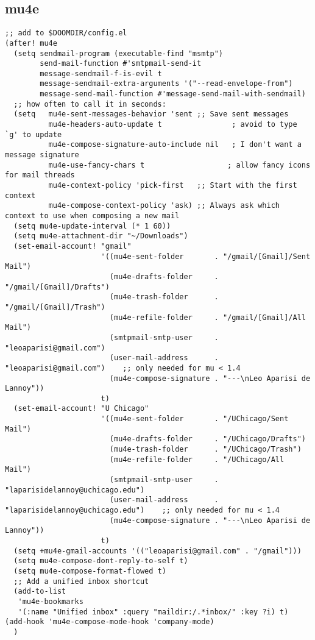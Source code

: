 \documentclass[c]{article}
\theoremstyle{plain}%
\theoremstyle{definition}
\theoremstyle{remark}
\begin{document}
\subsection{mu4e}
\label{sec:org55bb9dd}
\begin{verbatim}
;; add to $DOOMDIR/config.el
(after! mu4e
  (setq sendmail-program (executable-find "msmtp")
        send-mail-function #'smtpmail-send-it
        message-sendmail-f-is-evil t
        message-sendmail-extra-arguments '("--read-envelope-from")
        message-send-mail-function #'message-send-mail-with-sendmail)
  ;; how often to call it in seconds:
  (setq   mu4e-sent-messages-behavior 'sent ;; Save sent messages
          mu4e-headers-auto-update t                ; avoid to type `g' to update
          mu4e-compose-signature-auto-include nil   ; I don't want a message signature
          mu4e-use-fancy-chars t                   ; allow fancy icons for mail threads
          mu4e-context-policy 'pick-first   ;; Start with the first context
          mu4e-compose-context-policy 'ask) ;; Always ask which context to use when composing a new mail
  (setq mu4e-update-interval (* 1 60))
  (setq mu4e-attachment-dir "~/Downloads")
  (set-email-account! "gmail"
                      '((mu4e-sent-folder       . "/gmail/[Gmail]/Sent Mail")
                        (mu4e-drafts-folder     . "/gmail/[Gmail]/Drafts")
                        (mu4e-trash-folder      . "/gmail/[Gmail]/Trash")
                        (mu4e-refile-folder     . "/gmail/[Gmail]/All Mail")
                        (smtpmail-smtp-user     . "leoaparisi@gmail.com")
                        (user-mail-address      . "leoaparisi@gmail.com")    ;; only needed for mu < 1.4
                        (mu4e-compose-signature . "---\nLeo Aparisi de Lannoy"))
                      t)
  (set-email-account! "U Chicago"
                      '((mu4e-sent-folder       . "/UChicago/Sent Mail")
                        (mu4e-drafts-folder     . "/UChicago/Drafts")
                        (mu4e-trash-folder      . "/UChicago/Trash")
                        (mu4e-refile-folder     . "/UChicago/All Mail")
                        (smtpmail-smtp-user     . "laparisidelannoy@uchicago.edu")
                        (user-mail-address      . "laparisidelannoy@uchicago.edu")    ;; only needed for mu < 1.4
                        (mu4e-compose-signature . "---\nLeo Aparisi de Lannoy"))
                      t)
  (setq +mu4e-gmail-accounts '(("leoaparisi@gmail.com" . "/gmail")))
  (setq mu4e-compose-dont-reply-to-self t)
  (setq mu4e-compose-format-flowed t)
  ;; Add a unified inbox shortcut
  (add-to-list
   'mu4e-bookmarks
   '(:name "Unified inbox" :query "maildir:/.*inbox/" :key ?i) t)
(add-hook 'mu4e-compose-mode-hook 'company-mode)
  )
\end{verbatim}
\end{document}

